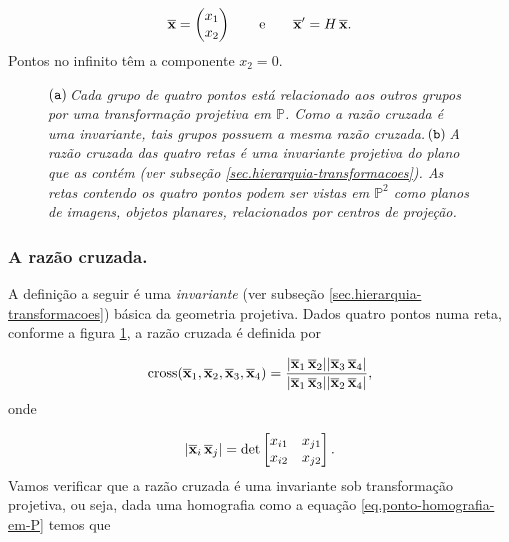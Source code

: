 \begin{equation}\label{eq.ponto-homografia-em-P}
\overline{\mathbf{x}}=
\begin{pmatrix}
x_1\\
x_2
\end{pmatrix}
\qquad\text{e}\qquad
\overline{\mathbf{x}}'=H\,\overline{\mathbf{x}}.
\end{equation}
Pontos no infinito têm a componente $x_2=0$.

\begin{figure}[!htb]
\centering
{}
\quad
{}
\caption{$({\tt a})\,$\textit{Cada grupo de quatro pontos está relacionado aos outros grupos por uma transformação projetiva em ${\mathbb{P}}$. Como a razão cruzada é uma invariante, tais grupos possuem a mesma razão cruzada.}$\,({\tt b})\,$\textit{A razão cruzada das quatro retas é uma invariante projetiva do plano que as contém (ver subseção \ref{sec.hierarquia-transformacoes}). As retas contendo os quatro pontos podem ser vistas em ${\mathbb{P}^2}$ como planos de imagens, objetos planares, relacionados por centros de projeção.}}
\label{fig.razao-cruzada}
\end{figure}

\subsubsection*{A razão cruzada.}
A definição a seguir é uma \textit{invariante} (ver subseção \ref{sec.hierarquia-transformacoes}) básica da geometria projetiva. Dados quatro pontos numa reta, conforme a figura \ref{fig.razao-cruzada}, a razão cruzada é definida por 

\begin{equation*}
\text{cross}(\overline{\mathbf{x}}_1,\overline{\mathbf{x}}_2,\overline{\mathbf{x}}_3,\overline{\mathbf{x}}_4)=\frac{|\overline{\mathbf{x}}_1\,\overline{\mathbf{x}}_2||\overline{\mathbf{x}}_3\,\overline{\mathbf{x}}_4|}{|\overline{\mathbf{x}}_1\,\overline{\mathbf{x}}_3||\overline{\mathbf{x}}_2\,\overline{\mathbf{x}}_4|},
\end{equation*}
onde 

\begin{equation*}
|\overline{\mathbf{x}}_i\,\overline{\mathbf{x}}_j|=
\text{det}
\begin{bmatrix}
x_{i1}&x_{j1}\\
x_{i2}&x_{j2}
\end{bmatrix}.
\end{equation*}
Vamos verificar que a razão cruzada é uma invariante sob transformação projetiva, ou seja, dada uma homografia como a equação \ref{eq.ponto-homografia-em-P} temos que 


